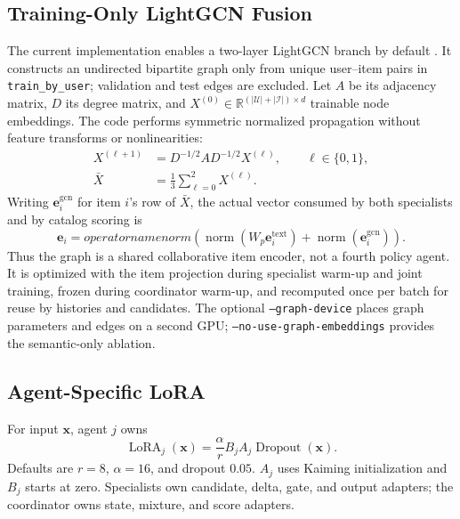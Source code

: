 \documentclass[11pt,a4paper]{article}
\newcommand{\R}{\mathbb{R}}
\begin{document}
\subsection{Training-Only LightGCN Fusion}

The current implementation enables a two-layer LightGCN branch by default
\cite{LIGHTGCN}. It constructs an undirected bipartite graph only from unique
user--item pairs in \texttt{train\_by\_user}; validation and test edges are
excluded. Let $A$ be its adjacency matrix, $D$ its degree matrix, and
$X^{(0)}\in\R^{(|\mathcal U|+|\mathcal I|)\times d}$ trainable node embeddings.
The code performs symmetric normalized propagation without feature transforms
or nonlinearities:
\begin{align}
  X^{(\ell+1)} &= D^{-1/2}AD^{-1/2}X^{(\ell)},\qquad \ell\in\{0,1\},\\
  \bar X &= \frac{1}{3}\sum_{\ell=0}^{2}X^{(\ell)}.
\end{align}
Writing $\bm e_i^{\mathrm{gcn}}$ for item $i$'s row of $\bar X$, the actual
vector consumed by both specialists and by catalog scoring is
\begin{equation}
  \bm e_i=operatorname{norm}\!\left(
    \operatorname{norm}(W_p\bm e_i^{\mathrm{text}})+
    \operatorname{norm}(\bm e_i^{\mathrm{gcn}})
  \right).
\end{equation}
Thus the graph is a shared collaborative item encoder, not a fourth policy
agent. It is optimized with the item projection during specialist warm-up and
joint training, frozen during coordinator warm-up, and recomputed once per
batch for reuse by histories and candidates. The optional
\texttt{--graph-device} places graph parameters and edges on a second GPU;
\texttt{--no-use-graph-embeddings} provides the semantic-only ablation.

\subsection{Agent-Specific LoRA}

For input $\bm x$, agent $j$ owns
\begin{equation}
  \operatorname{LoRA}_j(\bm x)
  =
  \frac{\alpha}{r}B_jA_j\operatorname{Dropout}(\bm x).
\end{equation}
Defaults are $r=8$, $\alpha=16$, and dropout $0.05$. $A_j$ uses Kaiming initialization and $B_j$ starts at zero. Specialists own candidate, delta, gate, and output adapters; the coordinator owns state, mixture, and score adapters.
\end{document}

